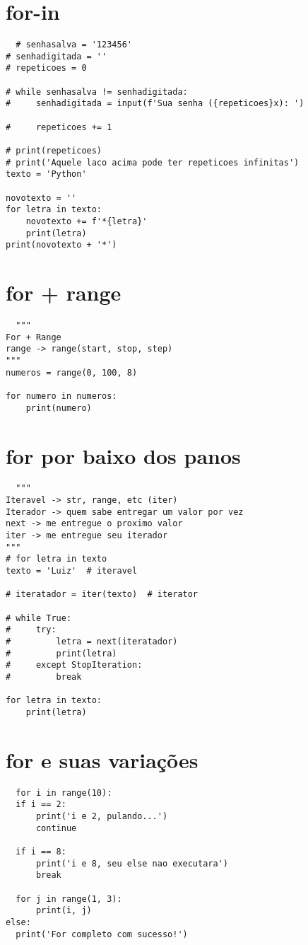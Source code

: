 \documentclass{article}
\begin{document}
\section{for-in}
\begin{lstlisting}
  # senhasalva = '123456'
# senhadigitada = ''
# repeticoes = 0

# while senhasalva != senhadigitada:
#     senhadigitada = input(f'Sua senha ({repeticoes}x): ')

#     repeticoes += 1

# print(repeticoes)
# print('Aquele laco acima pode ter repeticoes infinitas')
texto = 'Python'

novotexto = ''
for letra in texto:
    novotexto += f'*{letra}'
    print(letra)
print(novotexto + '*')
\end{lstlisting}
\section{for + range}
\begin{lstlisting}
  """
For + Range
range -> range(start, stop, step)
"""
numeros = range(0, 100, 8)

for numero in numeros:
    print(numero)
\end{lstlisting}
\section{for por baixo dos panos}
\begin{lstlisting}
  """
Iteravel -> str, range, etc (iter)
Iterador -> quem sabe entregar um valor por vez
next -> me entregue o proximo valor
iter -> me entregue seu iterador
"""
# for letra in texto
texto = 'Luiz'  # iteravel

# iteratador = iter(texto)  # iterator

# while True:
#     try:
#         letra = next(iteratador)
#         print(letra)
#     except StopIteration:
#         break

for letra in texto:
    print(letra)
\end{lstlisting}
\section{for e suas variações}
\begin{lstlisting}
  for i in range(10):
  if i == 2:
      print('i e 2, pulando...')
      continue

  if i == 8:
      print('i e 8, seu else nao executara')
      break

  for j in range(1, 3):
      print(i, j)
else:
  print('For completo com sucesso!') 
\end{lstlisting}
\end{document}
